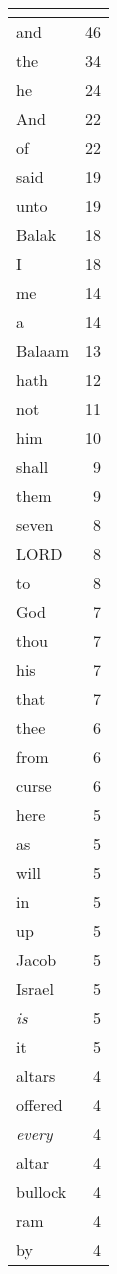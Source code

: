 \begin{center}
\begin{longtable}{l|r}
\hline \multicolumn{2}{c}{{ }} \\ \hline
\endfoot 
and & 46\\ \hline 
the & 34\\ \hline 
he & 24\\ \hline 
And & 22\\ \hline 
of & 22\\ \hline 
said & 19\\ \hline 
unto & 19\\ \hline 
Balak & 18\\ \hline 
I & 18\\ \hline 
me & 14\\ \hline 
a & 14\\ \hline 
Balaam & 13\\ \hline 
hath & 12\\ \hline 
not & 11\\ \hline 
him & 10\\ \hline 
shall & 9\\ \hline 
them & 9\\ \hline 
seven & 8\\ \hline 
LORD & 8\\ \hline 
to & 8\\ \hline 
God & 7\\ \hline 
thou & 7\\ \hline 
his & 7\\ \hline 
that & 7\\ \hline 
thee & 6\\ \hline 
from & 6\\ \hline 
curse & 6\\ \hline 
here & 5\\ \hline 
as & 5\\ \hline 
will & 5\\ \hline 
in & 5\\ \hline 
up & 5\\ \hline 
Jacob & 5\\ \hline 
Israel & 5\\ \hline 
\emph{is} & 5\\ \hline 
it & 5\\ \hline 
altars & 4\\ \hline 
offered & 4\\ \hline 
\emph{every} & 4\\ \hline 
altar & 4\\ \hline 
bullock & 4\\ \hline 
ram & 4\\ \hline 
by & 4\\ \hline 

\end{longtable}
\end{center}
